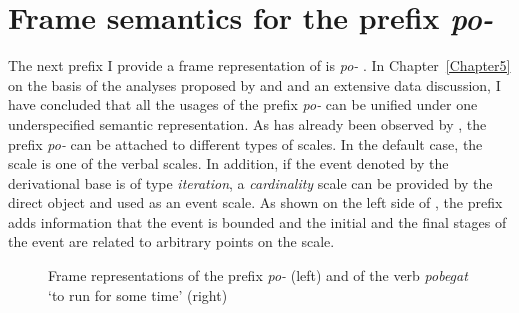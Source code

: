 \section{Frame semantics for the prefix \textit{po-}  }\label{section:frame:po}
The next prefix I provide a frame representation of is \textit{po-}  . In Chapter~\ref{Chapter5} on the basis of the analyses proposed by \citet{Filip:00} and \citealt{Kagan:book} and an extensive data discussion, I have concluded that all the usages of the prefix \textit{po-}   can be unified under one underspecified semantic representation. As has already been observed by \citet{Kagan:book}, the prefix \textit{po-}   can be attached to different types of scales. In the default case, the scale is one of the verbal scales. In addition, if the event denoted by the derivational base is of type \textit{iteration}, a \textit{cardinality} scale can be provided by the direct object and used as an event scale. As shown on the left side of , the prefix adds information that the event is bounded and the initial and the final stages of the event are related to arbitrary points on the scale.

\begin{figure}
\begin{minipage}{0.4\textwidth}
\end{minipage}
\begin{minipage}{0.55\textwidth}
\end{minipage}
\caption{Frame representations of the prefix \textit{po-}   (left) and of the verb \textit{pobegat} `to run for some time' (right) \label{frame:po:delim}}
\end{figure}


